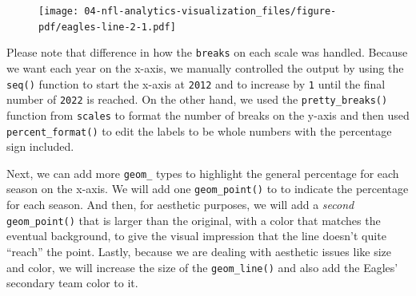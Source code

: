 \documentclass[
  letterpaper,
]{krantz}
\newenvironment{Shaded}{\begin{snugshade}}{\end{snugshade}}
\newcommand{\AttributeTok}[1]{\textcolor[rgb]{0.40,0.45,0.13}{#1}}
\newcommand{\DecValTok}[1]{\textcolor[rgb]{0.68,0.00,0.00}{#1}}
\newcommand{\FunctionTok}[1]{\textcolor[rgb]{0.28,0.35,0.67}{#1}}
\newcommand{\NormalTok}[1]{\textcolor[rgb]{0.00,0.23,0.31}{#1}}
\newcommand{\SpecialCharTok}[1]{\textcolor[rgb]{0.37,0.37,0.37}{#1}}
\newcommand{\StringTok}[1]{\textcolor[rgb]{0.13,0.47,0.30}{#1}}
\begin{document}
\begin{figure}[H]

{\centering \texttt{[image: 04-nfl-analytics-visualization\_files/figure-pdf/eagles-line-2-1.pdf]}

}

\end{figure}

Please note that difference in how the \texttt{breaks} on each scale was
handled. Because we want each year on the x-axis, we manually controlled
the output by using the \texttt{seq()} function to start the x-axis at
\texttt{2012} and to increase by \texttt{1} until the final number of
\texttt{2022} is reached. On the other hand, we used the
\texttt{pretty\_breaks()} function from \texttt{scales} to format the
number of breaks on the y-axis and then used \texttt{percent\_format()}
to edit the labels to be whole numbers with the percentage sign
included.

Next, we can add more \texttt{geom\_} types to highlight the general
percentage for each season on the x-axis. We will add one
\texttt{geom\_point()} to to indicate the percentage for each season.
And then, for aesthetic purposes, we will add a \emph{second}
\texttt{geom\_point()} that is larger than the original, with a color
that matches the eventual background, to give the visual impression that
the line doesn't quite ``reach'' the point. Lastly, because we are
dealing with aesthetic issues like size and color, we will increase the
size of the \texttt{geom\_line()} and also add the Eagles' secondary
team color to it.

\begin{Shaded}
\end{Shaded}
\end{document}
